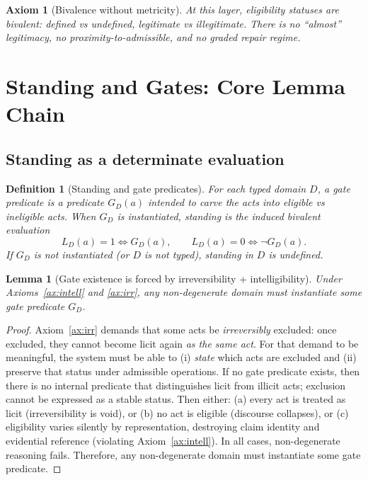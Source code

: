 \documentclass[12pt]{article}
\newtheorem{definition}{Definition}
\newtheorem{axiom}{Axiom}
\newtheorem{lemma}{Lemma}
\begin{document}
\begin{axiom}[Bivalence without metricity]
\label{ax:biv}
At this layer, eligibility statuses are bivalent: defined vs undefined, legitimate vs illegitimate.
There is no ``almost'' legitimacy, no proximity-to-admissible, and no graded repair regime.
\end{axiom}

\section{Standing and Gates: Core Lemma Chain}
\label{sec:gates}

\subsection{Standing as a determinate evaluation}

\begin{definition}[Standing and gate predicates]
\label{def:standing}
For each typed domain $D$, a \emph{gate predicate} is a predicate $G_D(a)$ intended to carve the acts into eligible vs ineligible acts.
When $G_D$ is instantiated, standing is the induced bivalent evaluation
\[
L_D(a)=1 \iff G_D(a), \qquad L_D(a)=0 \iff \neg G_D(a).
\]
If $G_D$ is not instantiated (or $D$ is not typed), standing in $D$ is \emph{undefined}.
\end{definition}

\begin{lemma}[Gate existence is forced by irreversibility + intelligibility]
\label{lem:gate-existence}
Under Axioms~\ref{ax:intell} and \ref{ax:irr}, any non-degenerate domain must instantiate some gate predicate $G_D$.
\end{lemma}

\begin{proof}
Axiom~\ref{ax:irr} demands that some acts be \emph{irreversibly} excluded: once excluded, they cannot become licit again \emph{as the same act}.
For that demand to be meaningful, the system must be able to (i) \emph{state} which acts are excluded and (ii) preserve that status under admissible operations.
If no gate predicate exists, then there is no internal predicate that distinguishes licit from illicit acts; exclusion cannot be expressed as a stable status.
Then either: (a) every act is treated as licit (irreversibility is void), or (b) no act is eligible (discourse collapses), or (c) eligibility varies
silently by representation, destroying claim identity and evidential reference (violating Axiom~\ref{ax:intell}). In all cases, non-degenerate reasoning fails.
Therefore, any non-degenerate domain must instantiate some gate predicate.
\end{proof}
\end{document}
